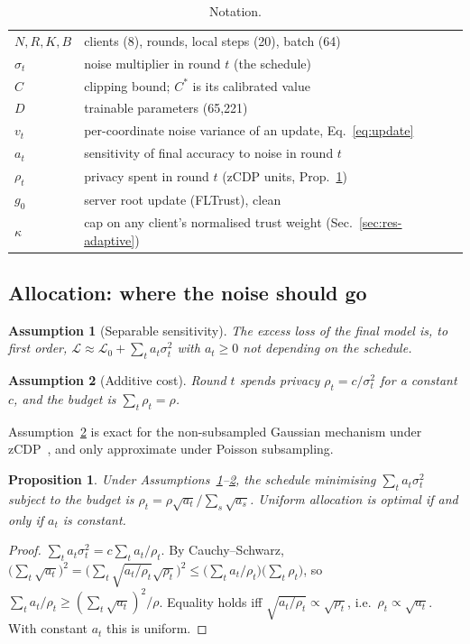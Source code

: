 \documentclass[journal]{IEEEtran}
\newtheorem{proposition}{Proposition}
\newtheorem{assumption}{Assumption}
\begin{document}
\begin{table}[t]
\centering
\caption{Notation.}
\label{tab:notation}
\begin{tabular}{@{}ll@{}}
\toprule
$N, R, K, B$ & clients (8), rounds, local steps (20), batch (64)\\
$\sigma_t$ & noise multiplier in round $t$ (the schedule)\\
$C$ & clipping bound; $C^\ast$ is its calibrated value\\
$D$ & trainable parameters (65,221)\\
$v_t$ & per-coordinate noise variance of an update, Eq.~\eqref{eq:update}\\
$a_t$ & sensitivity of final accuracy to noise in round $t$\\
$\rho_t$ & privacy spent in round $t$ (zCDP units, Prop.~\ref{prop:alloc})\\
$g_0$ & server root update (FLTrust), clean\\
$\kappa$ & cap on any client's normalised trust weight (Sec.~\ref{sec:res-adaptive})\\
\bottomrule
\end{tabular}
\end{table}

\subsection{Allocation: where the noise should go}
\begin{assumption}[Separable sensitivity]\label{as:sep}
The excess loss of the final model is, to first order, $\mathcal{L} \approx \mathcal{L}_0 +
\sum_t a_t \sigma_t^2$ with $a_t \ge 0$ not depending on the schedule.
\end{assumption}
\begin{assumption}[Additive cost]\label{as:cost}
Round $t$ spends privacy $\rho_t = c/\sigma_t^2$ for a constant $c$, and the budget is $\sum_t \rho_t = \rho$.
\end{assumption}
Assumption~\ref{as:cost} is exact for the non-subsampled Gaussian mechanism under zCDP~\cite{bun2016zcdp},
and only approximate under Poisson subsampling.

\begin{proposition}\label{prop:alloc}
Under Assumptions~\ref{as:sep}--\ref{as:cost}, the schedule minimising $\sum_t a_t\sigma_t^2$ subject
to the budget is $\rho_t = \rho\sqrt{a_t}/\sum_s\sqrt{a_s}$. Uniform allocation is optimal if and only
if $a_t$ is constant.
\end{proposition}
\begin{proof}
$\sum_t a_t\sigma_t^2 = c\sum_t a_t/\rho_t$. By Cauchy--Schwarz,
$\big(\sum_t\sqrt{a_t}\big)^2 = \big(\sum_t \sqrt{a_t/\rho_t}\sqrt{\rho_t}\big)^2 \le \big(\sum_t a_t/\rho_t\big)\big(\sum_t\rho_t\big)$,
so $\sum_t a_t/\rho_t \ge (\sum_t\sqrt{a_t})^2/\rho$. Equality holds iff $\sqrt{a_t/\rho_t} \propto
\sqrt{\rho_t}$, i.e.\ $\rho_t \propto \sqrt{a_t}$. With constant $a_t$ this is uniform.
\end{proof}
\end{document}
